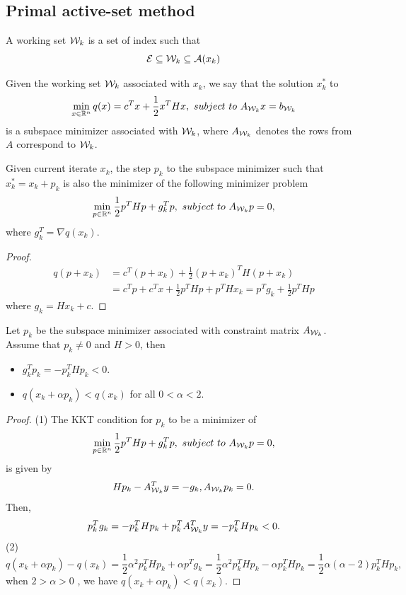 \begin{refsection}
\subsection{Primal active-set method}
\begin{definition}
A working set $\mathcal{W}_k$ is a set of index such that
$$\mathcal{E} \subseteq \mathcal{W}_k \subseteq \mathcal{A}(x_k)$$
\end{definition}



\begin{definition}
Given the working set $\mathcal{W}_k$ associated with $x_k$, we say that the solution $x_k^*$ to
$$\min_{x\in \mathbb{R}^n} q(x) = c^Tx + \frac{1}{2}x^THx,~subject~to~ A_{\mathcal{W}_k} x = b_{\mathcal{W}_k}$$
is a subspace minimizer associated with $\mathcal{W}_k$, where $A_{\mathcal{W}_k}$ denotes the rows from $A$ correspond to $\mathcal{W}_k$.
\end{definition}


\begin{lemma}
Given current iterate $x_k$, the step $p_k$ to the subspace minimizer such that $x_k^* = x_k + p_k$ is also the minimizer of the following minimizer problem
$$\min_{p\in\mathbb{R}^n} \frac{1}{2}p^THp + g_k^T p, ~subject~to~ A_{\mathcal{W}_k}p = 0,$$
where $g_k^T = \nabla q(x_k)$.
\end{lemma}
\begin{proof}
\begin{align*}
q(p+x_k) & = c^T(p +x_k) + \frac{1}{2}(p + x_k)^TH(p + x_k) \\
&= c^Tp + c^Tx + \frac{1}{2}p^THp + p^THx_k = p^Tg_k + \frac{1}{2}p^THp
\end{align*}
where $g_k = Hx_k + c$.	
\end{proof}


\begin{lemma}\label{ch:constrained-nonlinear-optimization:th:subspaceMinimizerStepAsDescentStep}
	Let $p_k$ be the subspace minimizer associated with constraint matrix $A_{\mathcal{W}_k}$.
Assume that $p_k \neq 0$ and $H > 0$, then
\begin{itemize}
	\item $g_k^Tp_k = - p^T_kHp_k < 0$.
	\item $q(x_k + \alpha p_k) < q(x_k)$ for all $0< \alpha <2$.
\end{itemize}
\end{lemma}
\begin{proof}
(1) The KKT condition for $p_k$ to be a minimizer of
$$\min_{p\in\mathbb{R}^n} \frac{1}{2}p^THp + g_k^T p, ~subject~to~ A_{\mathcal{W}_k}p = 0,$$
is given by
$$Hp_k - A^T_{\mathcal{W}_k}y = -g_k, A_{\mathcal{W}_k}p_k = 0.$$
Then, $$ p^T_kg_k = -p^T_kHp_k + p^T_kA^T_{\mathcal{W}_k}y = -p_k^THp_k < 0.$$
(2) $$q(x_k + \alpha p_k) - q(x_k) = \frac{1}{2}\alpha^2 p^T_kHp_k + \alpha p^Tg_k = \frac{1}{2}\alpha^2 p^T_kHp_k - \alpha p^T_kHp_k = \frac{1}{2}\alpha(\alpha - 2)p^T_kHp_k, $$
when $2 > \alpha > 0$ , we have $q(x_k + \alpha p_k) < q(x_k)$.
\end{proof}


\end{refsection}
